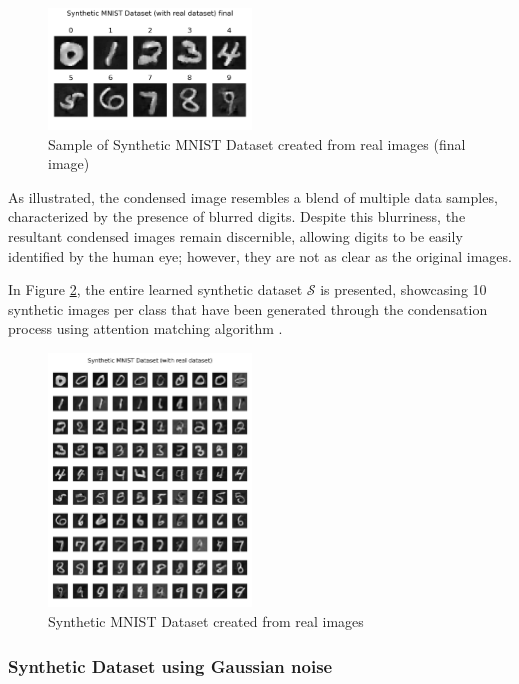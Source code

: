 \documentclass[conference, compsoc]{IEEEtran}
\begin{document}
	\begin{figure}[H]
		\centering
		\includegraphics[width=0.48\textwidth]{mnist_real_syn.png}
		\caption{Sample of Synthetic MNIST Dataset created from real images (final image)}
		\label{fig:mnist_real_syn}
	\end{figure}
	
	As illustrated, the condensed image resembles a blend of multiple data samples, characterized by the presence of blurred digits. Despite this blurriness, the resultant condensed images remain discernible, allowing digits to be easily identified by the human eye; however, they are not as clear as the original images.
	
	In Figure \ref{fig:mnist_real_syn_all}, the entire learned synthetic dataset $\mathcal{S}$ is presented, showcasing 10 synthetic images per class that have been generated through the condensation process using attention matching algorithm \cite{sajedi2023datadamefficientdatasetdistillation}.
	
	\begin{figure}[H]
		\centering
		\includegraphics[width=0.48\textwidth]{mnist_real_syn_all.png}
		\caption{Synthetic MNIST Dataset created from real images}
		\label{fig:mnist_real_syn_all}
	\end{figure}
	\subsubsection{Synthetic Dataset using Gaussian noise} \hfill
	
\end{document}
